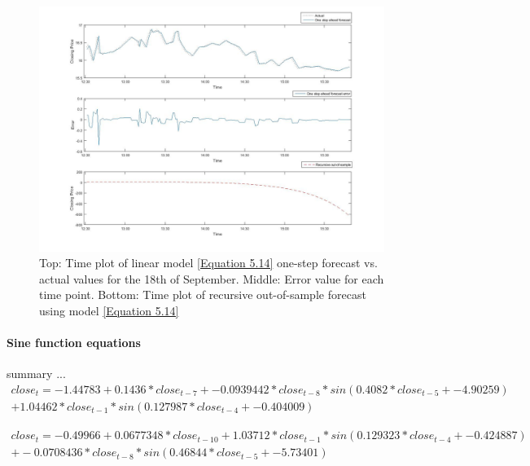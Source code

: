\documentclass[13pt]{report}
\begin{document}
\begin{figure}[H]
\centering
\label{VWlinear18fig}
\includegraphics[width=\textwidth]{18linear}
\caption{Top: Time plot of linear model \ref{Equation 5.14} one-step forecast vs. actual values for the 18th of September. Middle: Error value for each time point. Bottom: Time plot of recursive out-of-sample forecast using model \ref{Equation 5.14}}
\end{figure}

\paragraph{Sine function equations}\hfill \break
summary ...
\begin{equation}
\begin{align*}
close_{t} = -1.44783 + 0.1436 * close_{t-7} + -0.0939442 * close_{t-8} * sin ( 0.4082 * close_{t-5} + -4.90259 ) \\+ 1.04462 * close_{t-1} * sin ( 0.127987 * close_{t-4} + -0.404009 )
\end{align*}
\label{Equation 5.15}
\end{equation}

\begin{equation}
\begin{align*}
 close_{t} = -0.49966 + 0.0677348 * close_{t-10} + 1.03712 * close_{t-1} * sin ( 0.129323 * close_{t-4} + -0.424887 )\\ + -0.0708436 * close_{t-8} * sin ( 0.46844 * close_{t-5} + -5.73401 )
\end{align*}
\label{Equation 5.16}
\end{equation}
\end{document}
